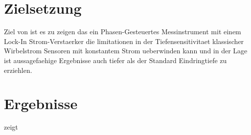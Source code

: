 \documentclass[11pt]{article}
\begin{document}
\section{Zielsetzung}

Ziel von \textcite{soni} ist es zu zeigen das ein Phasen-Gesteuertes Messinstrument mit einem Lock-In Strom-Verstaerker die limitationen in der Tiefensensitivitaet klassischer Wirbelstrom Sensoren mit konstantem Strom ueberwinden kann und in der Lage ist aussagefaehige Ergebnisse auch tiefer als der Standard Eindringtiefe zu erziehlen.

\section{Ergebnisse}

\textcite{soni} zeigt 

\printbibliography
\end{document}
